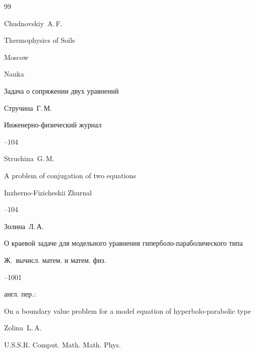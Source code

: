 \begin{thebibliography}{99}

\misctransl

\by Chudnovskiy~A.\,F.

\book Thermophysics of Soils 

\publ Moscow 


\publ Nauka






\paper Задача о сопряжении двух уравнений

\by Стручина~Г.\,М.

\jour Инженерно-физический журнал




--104

\misctransl

\by Struchina~G.\,M.

\paper A problem of conjugation of two equations

\jour Inzherno-Fizicheskii Zhurnal 



–104






\by Золина~Л.\,А.

\paper О краевой задаче для модельного уравнения гиперболо-параболического типа

\jour Ж.~вычисл. матем. и матем. физ.




--1001

\transl англ. пер.:~

\paper On a boundary value problem for a model equation of hyperbolo-parabolic type

\by Zolina~L.\,A.

\jour U.S.S.R. Comput. Math. Math. Phys.





\end{thebibliography}
